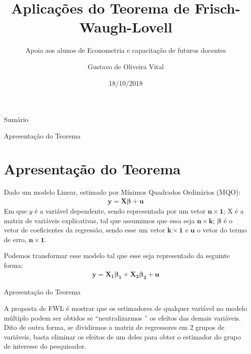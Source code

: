 \documentclass[11pt]{beamer}
\title{Aplicações do Teorema de Frisch-Waugh-Lovell}
\subtitle{Apoio aos alunos de Econometria e capacitação de futuros docentes}
\author{Gustavo de Oliveira Vital}
\institute{Universidade Federal Fluminense - Faculdade de Economia}
\date{18/10/2018}
\begin{document}
\begin{frame}
\titlepage
\end{frame}

\begin{frame}{Sumário}
\tableofcontents
\end{frame}

\begin{frame}{Apresentação do Teorema}
\section{Apresentação do Teorema}

    Dado um modelo Linear, estimado por Mínimos Quadrados Ordinários (MQO):
    \begin{align*}
		\mathbf{y = X \beta + u} 
	\end{align*}
    Em que $y$ é a variável dependente, sendo representada por um vetor $\mathbf{n \times 1}$; X é a matriz de variáveis explicativas, tal que assumimos que essa seja $\mathbf{n \times k}$; $\mathbf{\beta}$ é o vetor de coeficientes da regressão, sendo esse um vetor $\mathbf{k \times 1}$ e $\mathbf{u}$ o vetor do termo de erro, $\mathbf{n \times 1}$.  
    
    Podemos transformar esse modelo tal que esse seja representado da seguinte forma:
    \begin{align*}
		\mathbf{y = X_{1}\beta_{1} + X_{2}\beta_{2} + u} 
	\end{align*}
	
\end{frame}

\begin{frame}{Apresentação do Teorema}
\begin{block}{A proposta de FWL \'e mostrar que os estimadores de qualquer vari\'avel no modelo m\'ultiplo podem ser obtidos se ``neutralizarmos '' os efeitos das demais vari\'aveis. Dito de outra forma, se dividirmos a matriz de regressores em 2 grupos de vari\'aveis, basta eliminar os efeitos de um deles para obter o estimador do grupo de interesse do pesquisador.  }

\end{block}
\end{frame}
\end{document}
